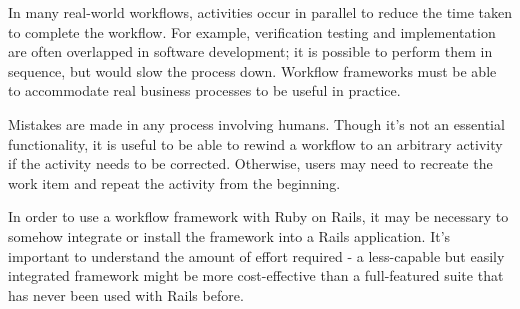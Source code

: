 In many real-world workflows, activities occur in parallel to reduce the time taken to complete the workflow. For example, verification testing and implementation are often overlapped in software development; it is possible to perform them in sequence, but would slow the process down. Workflow frameworks must be able to accommodate real business processes to be useful in practice.


Mistakes are made in any process involving humans. Though it’s not an essential functionality, it is useful to be able to rewind a workflow to an arbitrary activity if the activity needs to be corrected. Otherwise, users may need to recreate the work item and repeat the activity from the beginning.


In order to use a workflow framework with Ruby on Rails, it may be necessary to somehow integrate or install the framework into a Rails application. It’s important to understand the amount of effort required - a less-capable but easily integrated framework might be more cost-effective than a full-featured suite that has never been used with Rails before.
